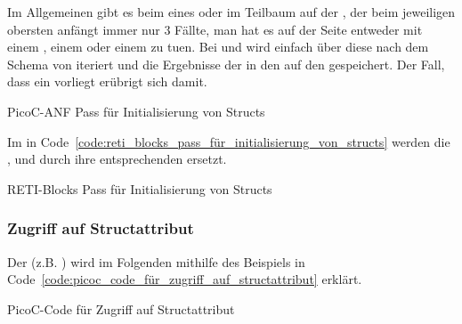 Im Allgemeinen gibt es beim  eines  oder  im Teilbaum auf der , der beim jeweiligen obersten  anfängt immer nur $3$ Fällte, man hat es auf der  Seite entweder mit einem , einem  oder einem  zu tuen. Bei  und  wird einfach über diese nach dem  Schema von  iteriert und die Ergebnisse der  in den  auf den  gespeichert. Der Fall, dass ein  vorliegt erübrigt sich damit.

\begin{code}
  \centering
  \caption{PicoC-ANF Pass für Initialisierung von Structs}
  \label{code:picoc_mon_pass_für_initialisierung_von_structs}
\end{code}

Im  in Code~\ref{code:reti_blocks_pass_für_initialisierung_von_structs} werden die  ,  und  durch ihre entsprechenden  ersetzt.

\begin{code}
  \centering
  \caption{RETI-Blocks Pass für Initialisierung von Structs}
  \label{code:reti_blocks_pass_für_initialisierung_von_structs}
\end{code}

\subsubsection{Zugriff auf Structattribut}
\label{sec:zugriff_auf_structattribut}

Der  (z.B. ) wird im Folgenden mithilfe des Beispiels in Code~\ref{code:picoc_code_für_zugriff_auf_structattribut} erklärt.

\begin{code}
  \centering
  \caption{PicoC-Code für Zugriff auf Structattribut}
  \label{code:picoc_code_für_zugriff_auf_structattribut}
\end{code}

